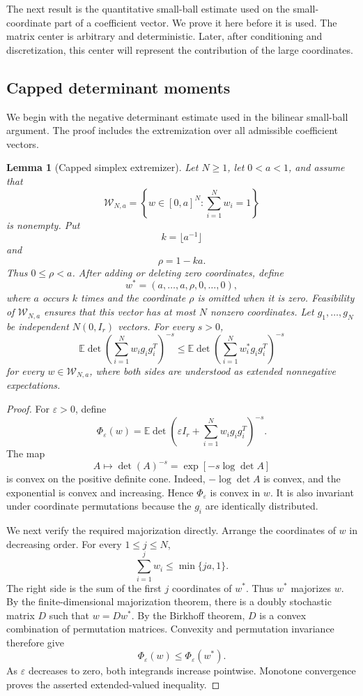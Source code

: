 \documentclass[11pt]{article}
\numberwithin{equation}{section}
\newtheorem{lemma}[theorem]{Lemma}
\theoremstyle{definition}
\theoremstyle{remark}
\newcommand{\E}{\mathbb E}
\newcommand{\1}{\boldsymbol 1}
\begin{document}
\begin{aiblock}

The next result is the quantitative small-ball
estimate used on the small-coordinate part of a
coefficient vector. We prove it here before it is
used. The matrix center is arbitrary and
deterministic. Later, after conditioning and
discretization, this center will represent the
contribution of the large coordinates.

\subsection{Capped determinant moments}

We begin with the negative determinant estimate used
in the bilinear small-ball argument. The proof
includes the extremization over all admissible
coefficient vectors.

\begin{lemma}[Capped simplex extremizer]
  \label{lem:det-capped-extremizer}
  Let $N\ge1$, let $0<a<1$, and assume that
  \[
    \mathcal W_{N,a}=\left\{w\in[0,a]^N:\sum_{i=1}^Nw_i=1\right\}
  \]
  is nonempty. Put
  \[
    k=\lfloor a^{-1}\rfloor
  \]
  and
  \[
    \rho=1-ka.
  \]
  Thus $0\le\rho<a$. After adding or deleting zero
  coordinates, define
  \[
    w^*=(a,\ldots,a,\rho,0,\ldots,0),
  \]
  where $a$ occurs $k$ times and the coordinate $\rho$
  is omitted when it is zero. Feasibility of
  $\mathcal W_{N,a}$ ensures that this vector has at
  most $N$ nonzero coordinates. Let
  $g_1,\ldots,g_N$ be independent $N(0,I_r)$ vectors.
  For every $s>0$,
  \[
    \E\det\left(\sum_{i=1}^Nw_ig_ig_i^T\right)^{-s} \le
    \E\det\left(\sum_{i=1}^Nw_i^*g_ig_i^T\right)^{-s}
  \]
  for every $w\in\mathcal W_{N,a}$, where both sides are
  understood as extended nonnegative expectations.
\end{lemma}

\begin{proof}
  For $\varepsilon>0$, define
  \[
    \Phi_\varepsilon(w)= \E\det\left(\varepsilon
    I_r+\sum_{i=1}^Nw_ig_ig_i^T\right)^{-s}.
  \]
  The map
  \[
    A\longmapsto\det(A)^{-s}=\exp[-s\log\det A]
  \]
  is convex on the positive definite cone. Indeed,
  $-\log\det A$ is convex, and the exponential is convex
  and increasing. Hence $\Phi_\varepsilon$ is convex in
  $w$. It is also invariant under coordinate
  permutations because the $g_i$ are identically
  distributed.

  We next verify the required majorization directly.
  Arrange the coordinates of $w$ in decreasing order.
  For every $1\le j\le N$,
  \[
    \sum_{i=1}^jw_i\le\min\{ja,1\}.
  \]
  The right side is the sum of the first $j$
  coordinates of $w^*$. Thus $w^*$ majorizes $w$. By the
  finite-dimensional majorization theorem, there is a
  doubly stochastic matrix $D$ such that $w=Dw^*$. By the
  Birkhoff theorem, $D$ is a convex combination of
  permutation matrices. Convexity and permutation
  invariance therefore give
  \[
    \Phi_\varepsilon(w)\le\Phi_\varepsilon(w^*).
  \]
  As $\varepsilon$ decreases to zero, both integrands
  increase pointwise. Monotone convergence proves the
  asserted extended-valued inequality.
\end{proof}


\end{aiblock}
\end{document}
